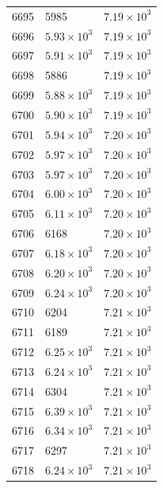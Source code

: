 \begin{table}[H]
\begin{tabular}{lll}
6695 & 5985 & $\displaystyle 7.19 \times 10^{3}$ \\
6696 & $\displaystyle 5.93 \times 10^{3}$ & $\displaystyle 7.19 \times 10^{3}$ \\
6697 & $\displaystyle 5.91 \times 10^{3}$ & $\displaystyle 7.19 \times 10^{3}$ \\
6698 & 5886 & $\displaystyle 7.19 \times 10^{3}$ \\
6699 & $\displaystyle 5.88 \times 10^{3}$ & $\displaystyle 7.19 \times 10^{3}$ \\
6700 & $\displaystyle 5.90 \times 10^{3}$ & $\displaystyle 7.19 \times 10^{3}$ \\
6701 & $\displaystyle 5.94 \times 10^{3}$ & $\displaystyle 7.20 \times 10^{3}$ \\
6702 & $\displaystyle 5.97 \times 10^{3}$ & $\displaystyle 7.20 \times 10^{3}$ \\
6703 & $\displaystyle 5.97 \times 10^{3}$ & $\displaystyle 7.20 \times 10^{3}$ \\
6704 & $\displaystyle 6.00 \times 10^{3}$ & $\displaystyle 7.20 \times 10^{3}$ \\
6705 & $\displaystyle 6.11 \times 10^{3}$ & $\displaystyle 7.20 \times 10^{3}$ \\
6706 & 6168 & $\displaystyle 7.20 \times 10^{3}$ \\
6707 & $\displaystyle 6.18 \times 10^{3}$ & $\displaystyle 7.20 \times 10^{3}$ \\
6708 & $\displaystyle 6.20 \times 10^{3}$ & $\displaystyle 7.20 \times 10^{3}$ \\
6709 & $\displaystyle 6.24 \times 10^{3}$ & $\displaystyle 7.20 \times 10^{3}$ \\
6710 & 6204 & $\displaystyle 7.21 \times 10^{3}$ \\
6711 & 6189 & $\displaystyle 7.21 \times 10^{3}$ \\
6712 & $\displaystyle 6.25 \times 10^{3}$ & $\displaystyle 7.21 \times 10^{3}$ \\
6713 & $\displaystyle 6.24 \times 10^{3}$ & $\displaystyle 7.21 \times 10^{3}$ \\
6714 & 6304 & $\displaystyle 7.21 \times 10^{3}$ \\
6715 & $\displaystyle 6.39 \times 10^{3}$ & $\displaystyle 7.21 \times 10^{3}$ \\
6716 & $\displaystyle 6.34 \times 10^{3}$ & $\displaystyle 7.21 \times 10^{3}$ \\
6717 & 6297 & $\displaystyle 7.21 \times 10^{3}$ \\
6718 & $\displaystyle 6.24 \times 10^{3}$ & $\displaystyle 7.21 \times 10^{3}$ \\

\end{tabular}
\end{table}
